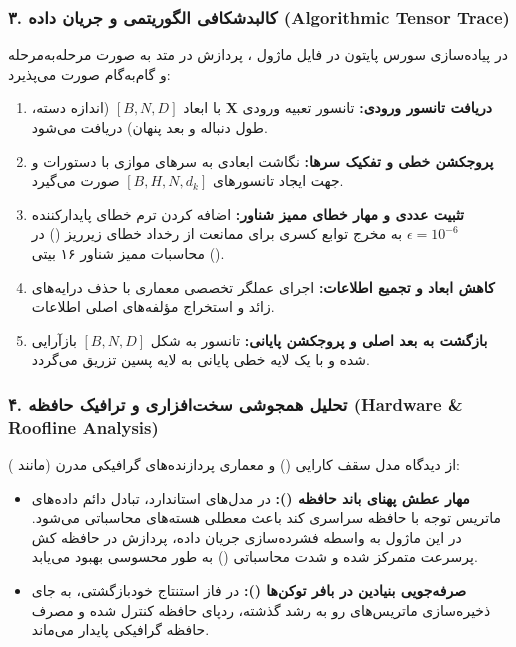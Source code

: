 \subsubsection*{۳. کالبدشکافی الگوریتمی و جریان داده (Algorithmic Tensor Trace)}
در پیاده‌سازی سورس پایتون در فایل ماژول ، پردازش در متد  به صورت مرحله‌به‌مرحله و گام‌به‌گام صورت می‌پذیرد:
\begin{enumerate}
\item \textbf{دریافت تانسور ورودی:} تانسور تعبیه ورودی $\mathbf{X}$ با ابعاد $[B, N, D]$ (اندازه دسته، طول دنباله و بعد پنهان) دریافت می‌شود.
\item \textbf{پروجکشن خطی و تفکیک سرها:} نگاشت ابعادی به سرهای موازی با دستورات  و  جهت ایجاد تانسورهای $[B, H, N, d_k]$ صورت می‌گیرد.
\item \textbf{تثبیت عددی و مهار خطای ممیز شناور:} اضافه کردن ترم خطای پایدارکننده $\epsilon = 10^{-6}$ به مخرج توابع کسری برای ممانعت از رخداد خطای زیرریز () در محاسبات ممیز شناور ۱۶ بیتی ().
\item \textbf{کاهش ابعاد و تجمیع اطلاعات:} اجرای عملگر تخصصی معماری با حذف درایه‌های زائد و استخراج مؤلفه‌های اصلی اطلاعات.
\item \textbf{بازگشت به بعد اصلی و پروجکشن پایانی:} تانسور به شکل $[B, N, D]$ بازآرایی شده و با یک لایه خطی پایانی به لایه پسین تزریق می‌گردد.
\end{enumerate}

\subsubsection*{۴. تحلیل همجوشی سخت‌افزاری و ترافیک حافظه (Hardware \& Roofline Analysis)}
از دیدگاه مدل سقف کارایی () و معماری پردازنده‌های گرافیکی مدرن (مانند ):
\begin{itemize}
\item \textbf{مهار عطش پهنای باند حافظه ():} در مدل‌های استاندارد، تبادل دائم داده‌های ماتریس توجه با حافظه سراسری کند  باعث معطلی هسته‌های محاسباتی می‌شود. در این ماژول به واسطه فشرده‌سازی جریان داده، پردازش در حافظه کش پرسرعت  متمرکز شده و شدت محاسباتی () به طور محسوسی بهبود می‌یابد.
\item \textbf{صرفه‌جویی بنیادین در بافر توکن‌ها ():} در فاز استنتاج خودبازگشتی، به جای ذخیره‌سازی ماتریس‌های رو به رشد گذشته، ردپای حافظه کنترل شده و مصرف حافظه گرافیکی پایدار می‌ماند.
\end{itemize}

